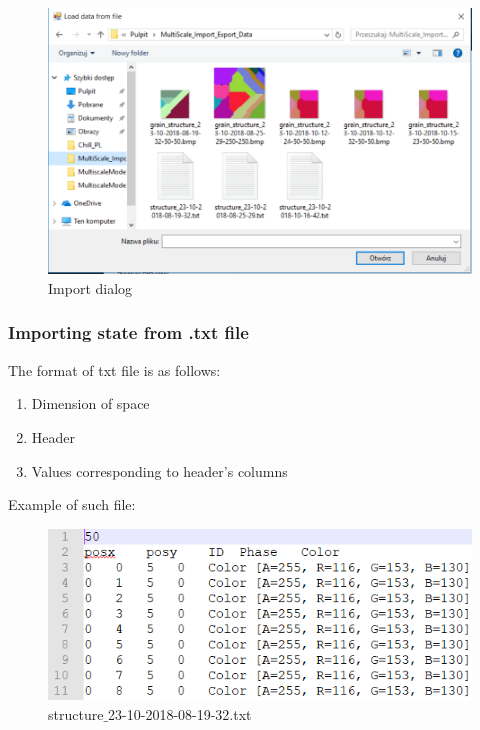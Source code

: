 \documentclass[a4paper, 11pt]{article}
\begin{document}
\begin{figure}[H]
\centering
  \includegraphics[width=\linewidth]{ImportFrom}
  \caption{Import dialog}
  \label{fig:boat1}
\end{figure}

\subsubsection{Importing state from .txt file}
The format of txt file is as follows:
\begin{enumerate}
\item Dimension of space
\item Header
\item Values corresponding to header's columns
\end{enumerate}
Example of such file:
\begin{figure}[H]
\centering
  \includegraphics[]{ExportedTxt}
  \caption{structure$\_$23-10-2018-08-19-32.txt}
  \label{fig:boat1}
\end{figure}
\end{document}
